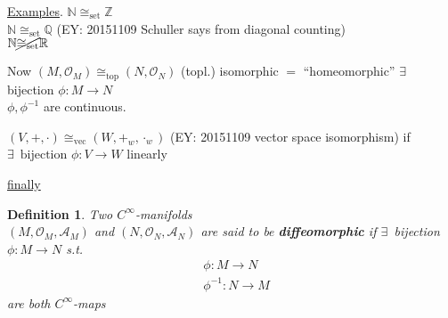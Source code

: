 \documentclass[10pt, twoside]{amsart}
\newtheorem{definition}{Definition}
\begin{document}
\begin{multicols*}{2}
\underline{Examples}.  $\mathbb{N} \cong_{\text{set}} \mathbb{Z}$ \\
$\mathbb{N} \cong_{\text{set}} \mathbb{Q}$  (EY: 20151109 Schuller says from diagonal counting)\\
$\mathbb{N} \cancel{\cong_{\text{set}}} \mathbb{R}$

Now $(M, \mathcal{O}_M) \cong_{\text{top}} (N,\mathcal{O}_N)$ (topl.) isomorphic $=$ ``homeomorphic'' $\exists \, $ bijection $\phi : M \to N$  \\
\phantom{ \quad \quad \, } $\phi, \phi^{-1}$ are continuous.  

$(V,+,\cdot) \cong_{\text{vec}} ( W,+_w,\cdot_w)$ (EY: 20151109 vector space isomorphism) if \\
$\exists \, \text{ bijection } \phi : V \to W$ linearly

\underline{finally}

\begin{definition}
  Two $C^{\infty}$-manifolds \\
  $(M,\mathcal{O}_M, \mathcal{A}_M)$ and $(N,\mathcal{O}_N, \mathcal{A}_N)$ are said to be \textbf{diffeomorphic} if $\exists \, $ bijection $\phi : M \to N$ s.t. 
\[
\begin{aligned} & \phi : M \to N \\
  & \phi^{-1} : N \to M \end{aligned}
    \]
are both $C^{\infty}$-maps



\end{definition}


\end{multicols*}
\end{document}
